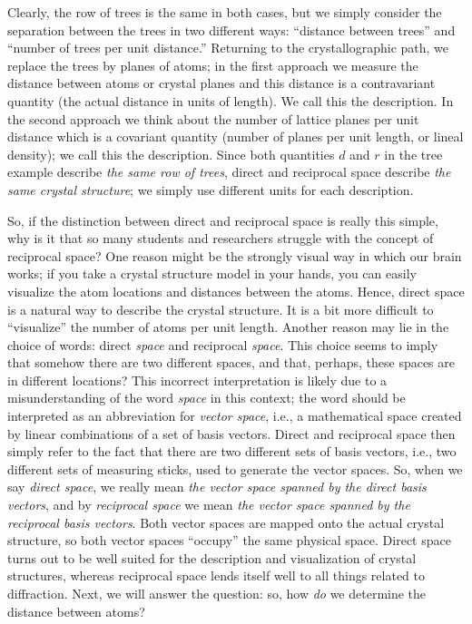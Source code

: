 Clearly, the row of trees is the same in both cases, but we simply consider the separation between the trees in two different ways: ``distance between trees'' and ``number of trees per unit distance.''  Returning to the crystallographic path, we replace the trees by planes of atoms; in the first approach we measure the distance between atoms or crystal planes and this distance is a contravariant quantity (the actual distance in units of length). We call this the  description. In the second approach we think about the number of lattice planes per unit distance which is a covariant quantity (number of planes per unit length, or lineal density); we call this the  description.  Since both quantities $d$ and $r$ in the tree example describe \textit{the same row of trees}, direct and reciprocal space describe \textit{the same crystal structure}; we simply use different units for each description.  

So, if the distinction between direct and reciprocal space is really this simple, why is it that so many students and researchers struggle with the concept of reciprocal space? One reason might be the strongly visual way in which our brain works; if you take a  crystal structure model in your hands, you can easily visualize the atom locations and distances between the atoms. Hence, direct space is a natural way to describe the crystal structure.  It is a bit more difficult to ``visualize'' the number of atoms per unit length.  Another reason may lie in the choice of words: direct \textit{space} and reciprocal \textit{space}.  This choice seems to imply that somehow there are two different spaces, and that, perhaps, these spaces are in different locations?  This incorrect interpretation is likely due to a misunderstanding of the word \textit{space} in this context; the word should be interpreted as an abbreviation for \textit{vector space}, i.e., a mathematical space created by linear combinations of a set of basis vectors.  Direct and reciprocal space then simply refer to the fact that there are two different sets of basis vectors, i.e., two different sets of measuring sticks, used to generate the vector spaces. So, when we say \textit{direct space}, we really mean \textit{the vector space spanned by the direct basis vectors}, and by \textit{reciprocal space} we mean \textit{the vector space spanned by the reciprocal basis vectors}. Both vector spaces are mapped onto the actual crystal structure, so both vector spaces ``occupy'' the same physical space. Direct space turns out to be well suited for the description and visualization of crystal structures, whereas reciprocal space lends itself well to all things related to diffraction. Next, we will answer the question: so, how \textit{do} we determine the distance between atoms?



